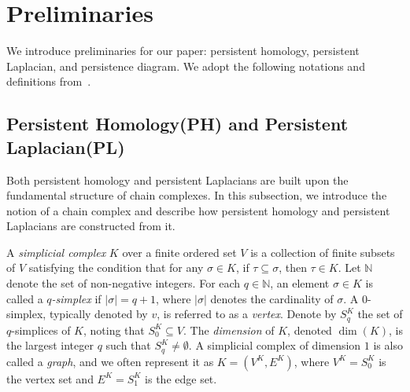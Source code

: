 \documentclass{article}
\begin{document}

\section{Preliminaries}
\label{sec:prelim}

We introduce preliminaries for our paper: persistent homology, persistent Laplacian, and persistence diagram. We adopt the following notations and definitions from~\cite{memoli2022persistent, WW25}.

\subsection{Persistent Homology(PH) and Persistent Laplacian(PL)}

Both persistent homology and persistent Laplacians are built upon the fundamental structure of chain complexes. In this subsection, we introduce the notion of a chain complex and describe how persistent homology and persistent Laplacians are constructed from it.


A \emph{simplicial complex} $K$ over a finite ordered set $V$ is a collection of finite subsets of $V$ satisfying the condition that for any $\sigma \in K$, if $\tau \subseteq \sigma$, then $\tau \in K$. Let $\mathbb{N}$ denote the set of non-negative integers. For each $q \in \mathbb{N}$, an element $\sigma \in K$ is called a \emph{$q$-simplex} if $|\sigma| = q + 1$, where $|\sigma|$ denotes the cardinality of $\sigma$. A $0$-simplex, typically denoted by $v$, is referred to as a \emph{vertex}. Denote by $S_q^K$ the set of $q$-simplices of $K$, noting that $S_0^K \subseteq V$. The \emph{dimension} of $K$, denoted $\dim(K)$, is the largest integer $q$ such that $S_q^K \neq \emptyset$. A simplicial complex of dimension $1$ is also called a \emph{graph}, and we often represent it as $K = (V^K, E^K)$, where $V^K = S_0^K$ is the vertex set and $E^K = S_1^K$ is the edge set.
\end{document}
